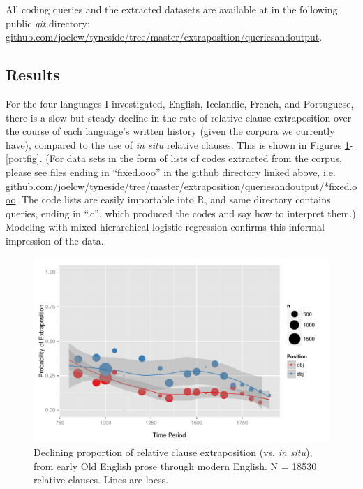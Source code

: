 
All coding queries and the extracted datasets are available at in the following public \textsl{git} directory: \url{github.com/joelcw/tyneside/tree/master/extraposition/queriesandoutput}.






\subsection{Results}
\label{results}

For the four languages I investigated, English, Icelandic, French, and Portuguese, there is a slow but steady decline in the rate of relative clause extraposition over the course of each language's written history (given the corpora we currently have), compared to the use of \textsl{in situ} relative clauses. This is shown in Figures \ref{engfig}-\ref{portfig}. (For data sets in the form of lists of codes extracted from the corpus, please see files ending in ``fixed.ooo'' in the github directory linked above, i.e. \url{github.com/joelcw/tyneside/tree/master/extraposition/queriesandoutput/*fixed.ooo}. The code lists are easily importable into R, and same directory contains queries, ending in ``.c'', which produced the codes and say how to interpret them.) Modeling with mixed hierarchical logistic regression confirms this informal impression of the data.


\begin{figure}

  \includegraphics[width=1.1\textwidth]{stableVarTalks/exSbjObjYearBinned50Loessymeb.pdf}
\caption{Declining proportion of relative clause extraposition (vs. \textsl{in situ}), from early Old English prose through modern English. N = 18530 relative clauses. Lines are loess.}
\label{engfig}       %
\end{figure}

